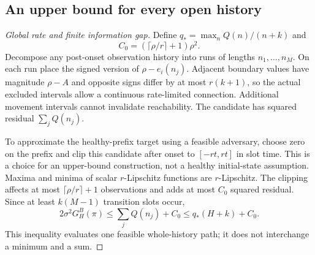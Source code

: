 \subsection{An upper bound for every open history}
\begin{proof}[Global rate and finite information gap]
Define $q_* =\max_n Q(n)/(n+k)$ and
\begin{equation}
 C_0=(\lceil\rho/r\rceil+1)\rho^2.
\end{equation}
Decompose any post-onset observation history into runs of lengths $n_1,\ldots,n_M$. On each run place the signed version of $\rho-e_i(n_j)$. Adjacent boundary values have magnitude $\rho-A$ and opposite signs differ by at most $r(k+1)$, so the actual excluded intervals allow a continuous rate-limited connection. Additional movement intervals cannot invalidate reachability. The candidate has squared residual $\sum_jQ(n_j)$.

To approximate the healthy-prefix target using a feasible adversary, choose zero on the prefix and clip this candidate after onset to $[-rt,rt]$ in slot time. This is a choice for an upper-bound construction, not a healthy initial-state assumption. Maxima and minima of scalar $r$-Lipschitz functions are $r$-Lipschitz. The clipping affects at most $\lceil\rho/r\rceil+1$ observations and adds at most $C_0$ squared residual. Since at least $k(M-1)$ transition slots occur,
\begin{equation}
 2\sigma^2G_H^B(\pi)
 \le\sum_jQ(n_j)+C_0
 \le q_*(H+k)+C_0.\label{eq:allconstupper}
\end{equation}
This inequality evaluates one feasible whole-history path; it does not interchange a minimum and a sum.


\end{proof}
